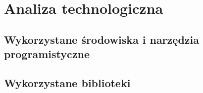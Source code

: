 \section{Analiza technologiczna}

\subsection{Wykorzystane środowiska i narzędzia programistyczne}

\subsection{Wykorzystane biblioteki}